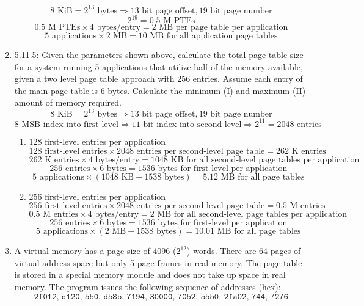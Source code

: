 \documentclass[10pt,letterpaper]{article}
\begin{document}
\begin{enumerate}[label=\textbf{Problem \arabic*.}]
\[8 \text{ KiB} = 2^{13} \text{ bytes} \Rightarrow 13 \text{ bit page offset}, 19 \text{ bit page number}\]
\[2^{19} = 0.5 \text{ M PTEs}\]
\[0.5 \text{ M PTEs} \times 4 \text{ bytes/entry} = 2 \text{ MB per page table per application}\]
\[5 \text{ applications} \times 2 \text{ MB} = \boxed{10 \text{ MB for all application page tables}}\]
\item 5.11.5: Given the parameters shown above, calculate the total page table size for a system running 5 applications that utilize half of the memory available, given a two level page table approach with 256 entries. Assume each entry of the main page table is 6 bytes. Calculate the minimum (I) and maximum (II) amount of memory required.
\[8 \text{ KiB} = 2^{13} \text{ bytes} \Rightarrow 13 \text{ bit page offset}, 19 \text{ bit page number}\]
\[8 \text{ MSB index into first-level} \Rightarrow 11 \text{ bit index into second-level} \Rightarrow 2^{11} = 2048 \text{ entries}\]
	\begin{enumerate}[label=(\Roman*)]
	\item 128 first-level entries per application
	\[128 \text{ first-level entries} \times 2048 \text{ entries per second-level page table} = 262 \text{ K entries}\]
	\[262 \text{ K entries} \times 4 \text{ bytes/entry} = 1048 \text{ KB for all second-level page tables per application}\]
	\[256 \text{ entries} \times 6 \text{ bytes} = 1536 \text{ bytes for first-level per application}\]
	\[5 \text{ applications} \times (1048 \text{ KB} + 1538 \text{ bytes}) = \boxed{5.12 \text{ MB for all page tables}}\]
	\item 256 first-level entries per application
	\[256 \text{ first-level entries} \times 2048 \text{ entries per second-level page table} = 0.5 \text{ M entries}\]
	\[0.5 \text{ M entries} \times 4 \text{ bytes/entry} = 2 \text{ MB for all second-level page tables per application}\]
	\[256 \text{ entries} \times 6 \text{ bytes} = 1536 \text{ bytes for first-level per application}\]
	\[5 \text{ applications} \times (2 \text{ MB} + 1538 \text{ bytes}) = \boxed{10.01 \text{ MB for all page tables}}\]
	\end{enumerate}
\item A virtual memory has a page size of 4096 ($2^{12}$) words. There are 64 pages of virtual address space but only 5 page frames in real memory. The page table is stored in a special memory module and does not take up space in real memory. The program issues the following sequence of addresses (hex):
\[\texttt{2f012, d120, 550, d58b, 7194, 30000, 7052, 5550, 2fa02, 744, 7276}\]

\end{enumerate}
\end{document}
